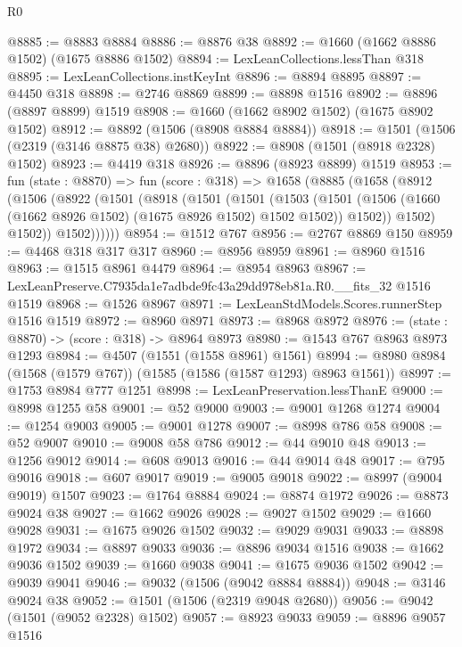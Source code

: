 \begin{lexlean}{R0}
\begin{coremodule}
@8885 := @8883 @8884
@8886 := @8876 @38
@8892 := @1660 (@1662 @8886 @1502) (@1675 @8886 @1502)
@8894 := LexLeanCollections.lessThan @318
@8895 := LexLeanCollections.instKeyInt
@8896 := @8894 @8895
@8897 := @4450 @318
@8898 := @2746 @8869
@8899 := @8898 @1516
@8902 := @8896 (@8897 @8899) @1519
@8908 := @1660 (@1662 @8902 @1502) (@1675 @8902 @1502)
@8912 := @8892 (@1506 (@8908 @8884 @8884))
@8918 := @1501 (@1506 (@2319 (@3146 @8875 @38) @2680))
@8922 := @8908 (@1501 (@8918 @2328) @1502)
@8923 := @4419 @318
@8926 := @8896 (@8923 @8899) @1519
@8953 := fun (state : @8870) =>
  fun (score : @318) =>
  @1658
    (@8885
      (@1658
        (@8912
          (@1506
            (@8922
              (@1501
                (@8918
                  (@1501
                    (@1501
                      (@1503
                        (@1501
                          (@1506 (@1660 (@1662 @8926 @1502) (@1675 @8926 @1502) @1502 @1502))
                          @1502))
                      @1502)
                    @1502))
                @1502))))))
@8954 := @1512 @767
@8956 := @2767 @8869 @150
@8959 := @4468 @318 @317 @317
@8960 := @8956 @8959
@8961 := @8960 @1516
@8963 := @1515 @8961 @4479
@8964 := @8954 @8963
@8967 := LexLeanPreserve.C7935da1e7adbde9fc43a29dd978eb81a.R0.__fits_32 @1516 @1519
@8968 := @1526 @8967
@8971 := LexLeanStdModels.Scores.runnerStep @1516 @1519
@8972 := @8960 @8971
@8973 := @8968 @8972
@8976 := (state : @8870) -> (score : @318) -> @8964 @8973
@8980 := @1543 @767 @8963 @8973 @1293
@8984 := @4507 (@1551 (@1558 @8961) @1561)
@8994 := @8980 @8984 (@1568 (@1579 @767)) (@1585 (@1586 (@1587 @1293) @8963 @1561))
@8997 := @1753 @8984 @777 @1251
@8998 := LexLeanPreservation.lessThanE
@9000 := @8998 @1255 @58
@9001 := @52 @9000
@9003 := @9001 @1268 @1274
@9004 := @1254 @9003
@9005 := @9001 @1278
@9007 := @8998 @786 @58
@9008 := @52 @9007
@9010 := @9008 @58 @786
@9012 := @44 @9010 @48
@9013 := @1256 @9012
@9014 := @608 @9013
@9016 := @44 @9014 @48
@9017 := @795 @9016
@9018 := @607 @9017
@9019 := @9005 @9018
@9022 := @8997 (@9004 @9019) @1507
@9023 := @1764 @8884
@9024 := @8874 @1972
@9026 := @8873 @9024 @38
@9027 := @1662 @9026
@9028 := @9027 @1502
@9029 := @1660 @9028
@9031 := @1675 @9026 @1502
@9032 := @9029 @9031
@9033 := @8898 @1972
@9034 := @8897 @9033
@9036 := @8896 @9034 @1516
@9038 := @1662 @9036 @1502
@9039 := @1660 @9038
@9041 := @1675 @9036 @1502
@9042 := @9039 @9041
@9046 := @9032 (@1506 (@9042 @8884 @8884))
@9048 := @3146 @9024 @38
@9052 := @1501 (@1506 (@2319 @9048 @2680))
@9056 := @9042 (@1501 (@9052 @2328) @1502)
@9057 := @8923 @9033
@9059 := @8896 @9057 @1516

\end{coremodule}
\end{lexlean}
